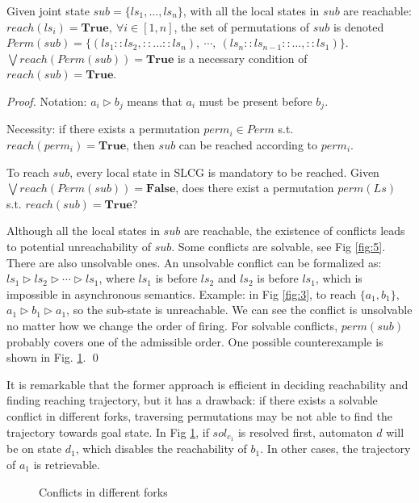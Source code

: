 \documentclass[runningheads]{llncs}
\begin{document}
\begin{proposition}\label{theoperm}
Given joint state $sub=\{ls_1,\ldots,ls_n\}$, with all the local states in $sub$ are reachable: $reach (ls_i)=\mathbf{True},\ \forall i\in[1,n]$, the set of permutations of $sub$ is denoted $Perm (sub)=\{(ls_1::ls_2,::\ldots ::ls_n),\ \cdots,\ (ls_n::ls_{n-1}::\ldots,::ls_1)\}$. $\bigvee reach (Perm (sub))=\mathbf{True}$ is a necessary condition of $reach (sub)=\mathbf{True}$.
\end{proposition}
\begin{proof}
Notation: $a_i\triangleright b_j$ means that $a_i$ must be present before $b_j$.

Necessity: if there exists a permutation $perm_i\in Perm$ s.t. $reach (perm_i)=\mathbf{True}$, then $sub$ can be reached according to $perm_i$.

To reach $sub$, every local state in SLCG is mandatory to be reached.
Given $\bigvee reach (Perm (sub))=\mathbf{False}$, does there exist a permutation $perm (Ls)$ s.t. $reach (sub)=\mathbf{True}$?

Although all the local states in $sub$ are reachable, the existence of conflicts leads to potential unreachability of $sub$.
Some conflicts are solvable, see Fig \ref{fig:5}. There are also unsolvable ones.
An unsolvable conflict can be formalized as: $ls_1\triangleright ls_2 \triangleright \cdots \triangleright ls_1$, where $ls_1$ is before $ls_2$ and $ls_2$ is before $ls_1$, which is impossible in asynchronous semantics.
Example: in Fig \ref{fig:3}, to reach $\{a_1,b_1\}$, $a_1\triangleright b_1\triangleright a_1$, so the sub-state is unreachable. 
We can see the conflict is unsolvable no matter how we change the order of firing.
For solvable conflicts, $perm(sub)$ probably covers one of the admissible order.
One possible counterexample is shown in Fig. \ref{FigConflictInForks}. %
\qed\end{proof}

It is remarkable that the former approach is efficient in deciding reachability and finding reaching trajectory, but it has a drawback: if there exists a solvable conflict in different forks, traversing permutations may be not able to find the trajectory towards goal state.
In Fig \ref{FigConflictInForks}, if $sol_{c_1}$ is resolved first, automaton $d$ will be on state $d_1$, which disables the reachability of $b_1$.
In other cases, the trajectory of $a_1$ is retrievable.%
\begin{figure}[ht]
\centering

\caption{Conflicts in different forks}\label{FigConflictInForks}
\end{figure}
\end{document}
